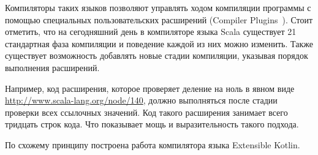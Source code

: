 Компиляторы таких языков позволяют управлять ходом компиляции программы с помощью специальных пользовательских расширений (Compiler Plugins~\cite{scala-compiler-plugin}). Стоит отметить, что на сегодняшний день в компиляторе языка Scala существует 21 стандартная фаза компиляции и поведение каждой из них можно изменить. Также существует возможность добавлять новые стадии компиляции, указывая порядок выполнения расширений.

Например, код расширения, которое проверяет деление на ноль в явном виде \url{http://www.scala-lang.org/node/140}, должно выполняться после стадии проверки всех ссылочных значений. Код такого расширения занимает всего тридцать строк кода. Что показывает мощь и выразительность такого подхода.

По схожему принципу построена работа компилятора языка Extensible Kotlin. \td